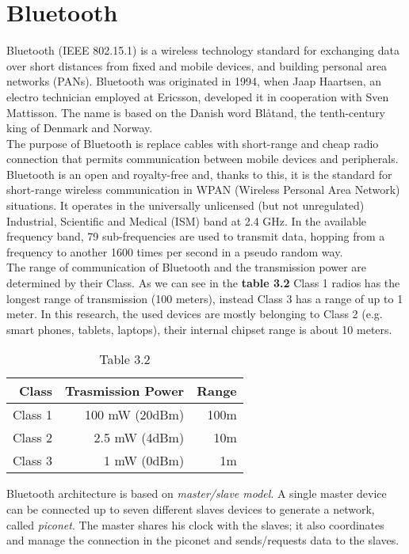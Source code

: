 \section{Bluetooth}
Bluetooth (IEEE 802.15.1) is a wireless technology standard for exchanging data over short distances from fixed and mobile devices, and building personal area networks (PANs).
Bluetooth was originated in 1994, when Jaap Haartsen, an electro technician employed at Ericsson, developed it in cooperation with Sven Mattisson. The name is based on the Danish word Bl\r{a}tand, the tenth-century king of Denmark and Norway. \\
The purpose of Bluetooth is replace cables with short-range and cheap radio connection that permits communication between mobile devices and peripherals.\\
Bluetooth is an open and royalty-free and, thanks to this, it is the standard for short-range wireless communication in WPAN (Wireless Personal Area Network) situations.
It operates in the universally unlicensed (but not unregulated) Industrial, Scientific and Medical (ISM) band at 2.4 GHz.
In the available frequency band, 79 sub-frequencies are used to transmit data, hopping from a frequency to another 1600 times per second in a pseudo random way.\\
\linebreak
The range of communication of Bluetooth and the transmission power are determined by their Class. As we can see in the \textbf{table 3.2} Class 1 radios has the longest range of transmission (100 meters), instead Class 3 has a range of up to 1 meter. 
In this research, the used devices are mostly belonging to Class 2 (e.g. smart phones, tablets, laptops), their internal chipset range is about 10 meters.
\begin{table}[H]
\centering
\caption*{Table 3.2}
\begin{tabular}{|r|r|r|} 
\hline
 Class & Trasmission Power & Range \\ \hline \hline 
 Class 1  & 100 mW (20dBm) &  100m \\
 Class 2  & 2.5 mW (4dBm) &   10m\\
 Class 3&  1 mW (0dBm) &  1m \\ \hline
\end{tabular}
\end{table}
Bluetooth architecture is based on \textit{master/slave model}. A single master device can be connected up to seven different slaves devices to generate a network, called \textit{piconet}. The master shares his clock with the slaves; it also coordinates and manage the connection in the piconet and sends/requests data to the slaves.\\
